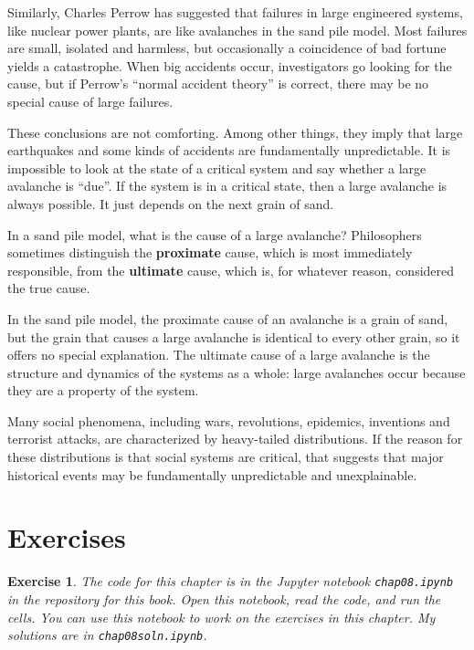 \documentclass[12pt]{book}
\theoremstyle{exercise}
\newtheorem{exercise}{Exercise}[chapter]
\begin{document}

Similarly, Charles Perrow has suggested that failures in large
engineered systems, like nuclear power plants, are like avalanches
in the sand pile model.  Most failures are small, isolated and
harmless, but occasionally a coincidence of bad fortune yields a
catastrophe.  When big accidents occur, investigators go looking for
the cause, but if Perrow's ``normal accident theory'' is correct,
there may be no special cause of large failures.


These conclusions are not comforting.  Among other things, they
imply that large earthquakes and some kinds of accidents are
fundamentally unpredictable.  It is impossible to look at the
state of a critical system and say whether a large avalanche
is ``due''.  If the system is in a critical state, then a large
avalanche is always possible.  It just depends on the
next grain of sand.

In a sand pile model, what is the cause of a large avalanche?
Philosophers sometimes distinguish the {\bf proximate} cause, which is
most immediately responsible, from the {\bf ultimate} cause, which is,
for whatever reason, considered the true cause.


In the sand pile model, the proximate cause of an avalanche is
a grain of sand, but the grain that causes a large avalanche
is identical to every other grain, so it offers no special explanation.
The ultimate cause of a large avalanche is the structure and
dynamics of the systems as a whole: large avalanches occur because
they are a property of the system.

Many social phenomena, including wars, revolutions, epidemics,
inventions and terrorist attacks, are characterized by heavy-tailed
distributions.  If the reason for these distributions is that
social systems are critical, that suggests that major historical
events may be fundamentally unpredictable and unexplainable.



\section{Exercises}


\begin{exercise}

The code for this chapter is in the Jupyter notebook {\tt chap08.ipynb}
in the repository for this book.  Open this notebook, read the code,
and run the cells.  You can use this notebook to work on the
exercises in this chapter.  My solutions are in {\tt chap08soln.ipynb}.

\end{exercise}
\end{document}
